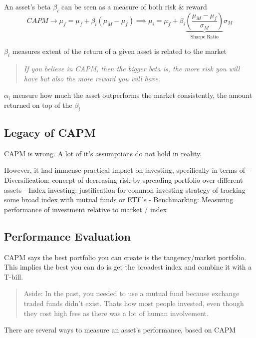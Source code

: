 \documentclass[
  oneside]{book}
\begin{document}
An asset's beta \(\beta_{i}\) can be seen as a measure of both risk \& reward
\[
CAPM \to \mu_{f}  = \mu_{f} + \beta_{i}(\mu_{M}-\mu_{f}) \implies \mu_{i} = \mu_{f} + \beta_{i}\underbrace{ \left(\frac{\mu_{M}-\mu_{f}}{\sigma_{M}}  \right)}_{ \text{Sharpe Ratio} }\sigma_{M}
\]

\(\beta_{i}\) measures extent of the return of a given asset is related to the market

\begin{quote}
\emph{If you believe in CAPM, then the bigger beta is, the more risk you will have but also the more reward you will have.}
\end{quote}

\(\alpha_{i}\) measure how much the asset outperforms the market consistently, the amount returned on top of the \(\beta_{i}\)

\hypertarget{legacy-of-capm}{%
\subsection{Legacy of CAPM}\label{legacy-of-capm}}

CAPM is wrong. A lot of it's assumptions do not hold in reality.

However, it had immense practical impact on investing, specifically in terms of
- Diversification: concept of decreasing risk by spreading portfolio over different assets
- Index investing: justification for common investing strategy of tracking some broad index with mutual funds or ETF's
- Benchmarking: Measuring performance of investment relative to market / index

\hypertarget{performance-evaluation}{%
\subsection{Performance Evaluation}\label{performance-evaluation}}

CAPM says the best portfolio you can create is the tangency/market portfolio. This implies the best you can do is get the broadest index and combine it with a T-bill.

\begin{quote}
Aside: In the past, you needed to use a mutual fund because exchange traded funds didn't exist. Thats how most people invested, even though they cost high fees as there was a lot of human involvement.
\end{quote}

There are several ways to measure an asset's performance, based on CAPM
\end{document}
